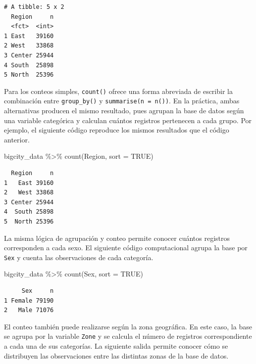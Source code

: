 \documentclass[
  spanish,
  11pt,
  letterpaper,
  oneside,
  open=any]{scrbook}
\newenvironment{Shaded}{\begin{snugshade}}{\end{snugshade}}
\newcommand{\AttributeTok}[1]{\textcolor[rgb]{0.40,0.45,0.13}{#1}}
\newcommand{\ConstantTok}[1]{\textcolor[rgb]{0.56,0.35,0.01}{#1}}
\newcommand{\FunctionTok}[1]{\textcolor[rgb]{0.28,0.35,0.67}{#1}}
\newcommand{\NormalTok}[1]{\textcolor[rgb]{0.00,0.23,0.31}{#1}}
\newcommand{\SpecialCharTok}[1]{\textcolor[rgb]{0.37,0.37,0.37}{#1}}
\begin{document}
\begin{verbatim}
# A tibble: 5 x 2
  Region     n
  <fct>  <int>
1 East   39160
2 West   33868
3 Center 25944
4 South  25898
5 North  25396
\end{verbatim}

Para los conteos simples, \texttt{count()} ofrece una forma abreviada de
escribir la combinación entre \texttt{group\_by()} y
\texttt{summarise(n\ =\ n())}. En la práctica, ambas alternativas
producen el mismo resultado, pues agrupan la base de datos según una
variable categórica y calculan cuántos registros pertenecen a cada
grupo. Por ejemplo, el siguiente código reproduce los mismos resultados
que el código anterior.

\begin{Shaded}
\begin{Highlighting}[]
\NormalTok{bigcity\_data }\SpecialCharTok{\%\textgreater{}\%}
  \FunctionTok{count}\NormalTok{(Region, }\AttributeTok{sort =} \ConstantTok{TRUE}\NormalTok{)}
\end{Highlighting}
\end{Shaded}

\begin{verbatim}
  Region     n
1   East 39160
2   West 33868
3 Center 25944
4  South 25898
5  North 25396
\end{verbatim}

La misma lógica de agrupación y conteo permite conocer cuántos registros
corresponden a cada sexo. El siguiente código computacional agrupa la
base por \texttt{Sex} y cuenta las observaciones de cada categoría.

\begin{Shaded}
\begin{Highlighting}[]
\NormalTok{bigcity\_data }\SpecialCharTok{\%\textgreater{}\%}
  \FunctionTok{count}\NormalTok{(Sex, }\AttributeTok{sort =} \ConstantTok{TRUE}\NormalTok{)}
\end{Highlighting}
\end{Shaded}

\begin{verbatim}
     Sex     n
1 Female 79190
2   Male 71076
\end{verbatim}

El conteo también puede realizarse según la zona geográfica. En este
caso, la base se agrupa por la variable \texttt{Zone} y se calcula el
número de registros correspondiente a cada una de sus categorías. La
siguiente salida permite conocer cómo se distribuyen las observaciones
entre las distintas zonas de la base de datos.
\end{document}
